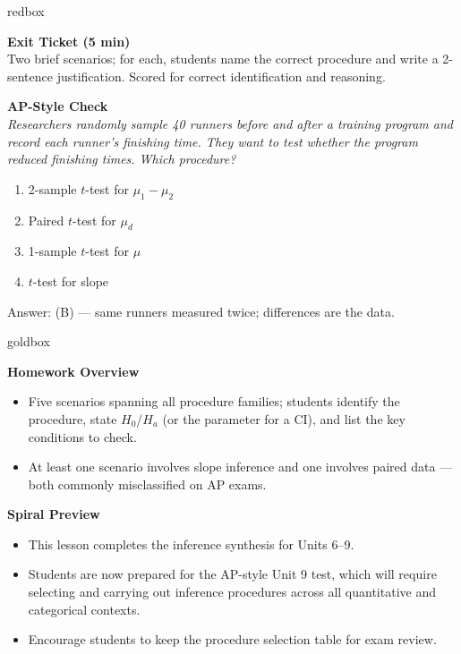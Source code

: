 \documentclass[10pt]{article}
\begin{document}
\begin{skillbox}{redbox}
\begin{minipage}[t]{0.48\linewidth}
    \textbf{Exit Ticket (5 min)}\\
    Two brief scenarios; for each, students name the correct procedure and write
    a 2-sentence justification. Scored for correct identification and reasoning.
\end{minipage}
\hfill
\begin{minipage}[t]{0.48\linewidth}
    \textbf{AP-Style Check}\\
    \textit{Researchers randomly sample 40 runners before and after a training program
    and record each runner's finishing time. They want to test whether the program
    reduced finishing times. Which procedure?}
    \begin{enumerate}[label=(\Alph*)]
        \item 2-sample $t$-test for $\mu_1 - \mu_2$
        \item Paired $t$-test for $\mu_d$
        \item 1-sample $t$-test for $\mu$
        \item $t$-test for slope
    \end{enumerate}
    Answer: (B) --- same runners measured twice; differences are the data.
\end{minipage}
\end{skillbox}

\begin{skillbox}{goldbox}
\begin{minipage}[t]{0.48\linewidth}
    \textbf{Homework Overview}
    \begin{itemize}
        \item Five scenarios spanning all procedure families; students identify the
              procedure, state $H_0$/$H_a$ (or the parameter for a CI), and list
              the key conditions to check.
        \item At least one scenario involves slope inference and one involves
              paired data --- both commonly misclassified on AP exams.
    \end{itemize}
\end{minipage}
\hfill
\begin{minipage}[t]{0.48\linewidth}
    \textbf{Spiral Preview}
    \begin{itemize}
        \item This lesson completes the inference synthesis for Units 6--9.
        \item Students are now prepared for the AP-style Unit 9 test, which will
              require selecting and carrying out inference procedures across all
              quantitative and categorical contexts.
        \item Encourage students to keep the procedure selection table for exam review.
    \end{itemize}
\end{minipage}
\end{skillbox}
\end{document}
